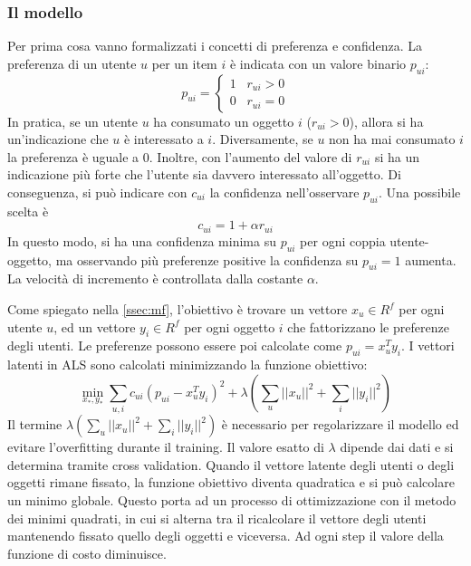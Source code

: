 \subsubsection{Il modello}
Per prima cosa vanno formalizzati i concetti di preferenza e confidenza. La preferenza di un utente $u$ per un item $i$ è indicata con un valore binario $p_{ui}$:
$$
p_{ui} =     \begin{cases}
				1 \;\;\; r_{ui} > 0 \\
				0 \;\;\; r_{ui} = 0
              \end{cases}
$$
In pratica, se un utente $u$ ha consumato un oggetto $i$ ($r_{ui} > 0$), allora si ha un'indicazione che $u$ è interessato a $i$. Diversamente, se $u$ non ha mai consumato $i$ la preferenza è uguale a 0. Inoltre, con l'aumento del valore di $r_{ui}$ si ha un indicazione più forte che l'utente sia davvero interessato all'oggetto. Di conseguenza, si può indicare con $c_{ui}$ la confidenza nell'osservare $p_{ui}$. Una possibile scelta è
$$
c_{ui} = 1 + \alpha r_{ui}
$$
In questo modo, si ha una confidenza minima su $p_{ui}$ per ogni coppia utente-oggetto, ma osservando più preferenze positive la confidenza su $p_{ui} = 1$ aumenta. La velocità di incremento è controllata dalla costante $\alpha$.

Come spiegato nella \autoref{ssec:mf}, l'obiettivo è trovare un vettore $x_u \in R^f$ per ogni utente $u$, ed un vettore $y_i \in R^f$ per ogni oggetto $i$ che fattorizzano le preferenze degli utenti. Le preferenze possono essere poi calcolate come $p_{ui} = x_u^Ty_i$. I vettori latenti in ALS sono calcolati minimizzando la funzione obiettivo:	
$$
\min_{x_*,y_*} \sum_{u,i} c_{ui} (p_{ui} - x_u^Ty_i)^2 + 
\lambda \left( \sum_u ||x_u||^2 + \sum_i ||y_i||^2 \right)
$$
Il termine $\lambda \left( \sum_u ||x_u||^2 + \sum_i ||y_i||^2 \right)$ è necessario per regolarizzare il modello ed evitare l'overfitting durante il training. Il valore esatto di $\lambda$ dipende dai dati e si determina tramite cross validation. 
Quando il vettore latente degli utenti o degli oggetti rimane fissato, la funzione obiettivo diventa quadratica e si può calcolare un minimo globale. Questo porta ad un processo di ottimizzazione con il metodo dei minimi quadrati, in cui si alterna tra il ricalcolare il vettore degli utenti mantenendo fissato quello degli oggetti e viceversa. Ad ogni step il valore della funzione di costo diminuisce.

